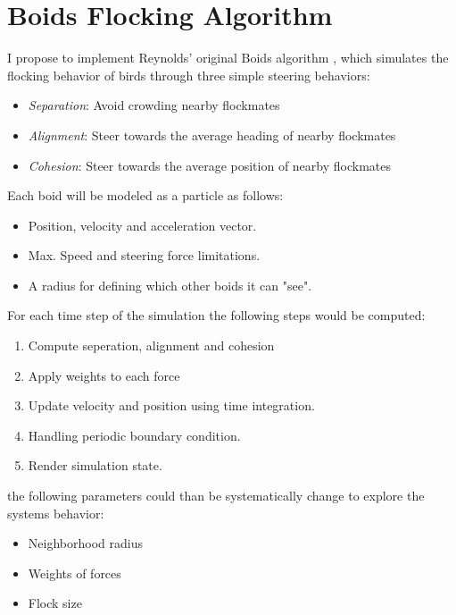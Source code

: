 \section{Boids Flocking Algorithm}
I propose to implement Reynolds' original Boids algorithm \cite{reynolds_flocks_1987}, which simulates the flocking behavior of birds through three simple steering behaviors:
%
\begin{itemize}
	\item \textit{Separation}: Avoid crowding nearby flockmates
	\item \textit{Alignment}: Steer towards the average heading of nearby flockmates
	\item \textit{Cohesion}: Steer towards the average position of nearby flockmates
\end{itemize}%
%
Each boid will be modeled as a particle as follows:
\begin{itemize}
	\item Position, velocity and acceleration vector.
	\item Max. Speed and steering force limitations.
	\item A radius for defining which other boids it can "see".
\end{itemize}
For each time step of the simulation the following steps would be computed:
\begin{enumerate}
	\item Compute seperation, alignment and cohesion
	\item Apply weights to each force
	\item Update velocity and position using time integration.
	\item Handling periodic boundary condition.
	\item Render simulation state.
\end{enumerate}
the following parameters could than be systematically change to explore the systems behavior:
\begin{itemize}
	\item Neighborhood radius
	\item Weights of forces
	\item Flock size
\end{itemize}
